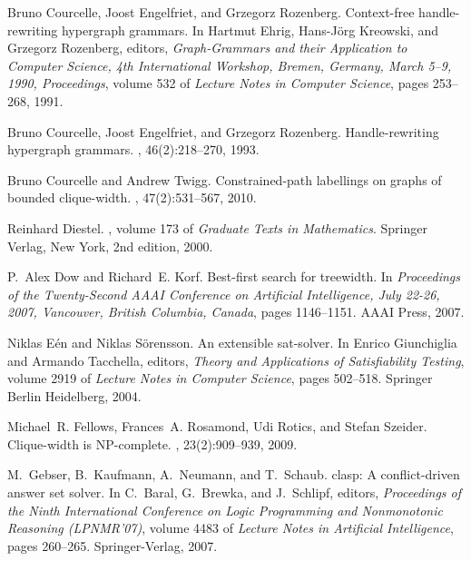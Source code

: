 \documentclass[10pt,usletter]{article}
\theoremstyle{remark}
\begin{document}
\begin{thebibliography}{10}
Bruno Courcelle, Joost Engelfriet, and Grzegorz Rozenberg.
\newblock Context-free handle-rewriting hypergraph grammars.
\newblock In Hartmut Ehrig, Hans-J{\"o}rg Kreowski, and Grzegorz Rozenberg,
  editors, {\em Graph-Grammars and their Application to Computer Science, 4th
  International Workshop, Bremen, Germany, March 5--9, 1990, Proceedings},
  volume 532 of {\em Lecture Notes in Computer Science}, pages 253--268, 1991.

Bruno Courcelle, Joost Engelfriet, and Grzegorz Rozenberg.
\newblock Handle-rewriting hypergraph grammars.
, 46(2):218--270, 1993.

Bruno Courcelle and Andrew Twigg.
\newblock Constrained-path labellings on graphs of bounded clique-width.
, 47(2):531--567, 2010.

Reinhard Diestel.
, volume 173 of {\em Graduate Texts in
  Mathematics}.
\newblock Springer Verlag, New York, 2nd edition, 2000.

P.~Alex Dow and Richard~E. Korf.
\newblock Best-first search for treewidth.
\newblock In {\em Proceedings of the Twenty-Second AAAI Conference on
  Artificial Intelligence, July 22-26, 2007, Vancouver, British Columbia,
  Canada}, pages 1146--1151. AAAI Press, 2007.

Niklas E\'en and Niklas S\"orensson.
\newblock An extensible sat-solver.
\newblock In Enrico Giunchiglia and Armando Tacchella, editors, {\em Theory and
  Applications of Satisfiability Testing}, volume 2919 of {\em Lecture Notes in
  Computer Science}, pages 502--518. Springer Berlin Heidelberg, 2004.

Michael~R. Fellows, Frances~A. Rosamond, Udi Rotics, and Stefan Szeider.
\newblock Clique-width is {NP}-complete.
, 23(2):909--939, 2009.

M.~Gebser, B.~Kaufmann, A.~Neumann, and T.~Schaub.
\newblock clasp: A conflict-driven answer set solver.
\newblock In C.~Baral, G.~Brewka, and J.~Schlipf, editors, {\em Proceedings of
  the Ninth International Conference on Logic Programming and Nonmonotonic
  Reasoning (LPNMR'07)}, volume 4483 of {\em Lecture Notes in Artificial
  Intelligence}, pages 260--265. Springer-Verlag, 2007.


\end{thebibliography}
\end{document}
